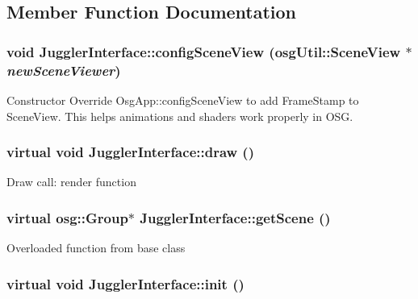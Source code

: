\subsection{Member Function Documentation}
\hypertarget{class_juggler_interface_ad139f98fc6a2d6b5f463ae90d8ce8597}{
\subsubsection[{configSceneView}]{\setlength{\rightskip}{0pt plus 5cm}void JugglerInterface::configSceneView (osgUtil::SceneView $\ast$ {\em newSceneViewer})}}
\label{class_juggler_interface_ad139f98fc6a2d6b5f463ae90d8ce8597}
Constructor Override OsgApp::configSceneView to add FrameStamp to SceneView. This helps animations and shaders work properly in OSG. \hypertarget{class_juggler_interface_aa721246fac943544cb376a21c1d69edb}{
\subsubsection[{draw}]{\setlength{\rightskip}{0pt plus 5cm}virtual void JugglerInterface::draw ()}}
\label{class_juggler_interface_aa721246fac943544cb376a21c1d69edb}
Draw call: render function \hypertarget{class_juggler_interface_ab17e6aa7dc1a248b1a74687a815cb8c3}{
\subsubsection[{getScene}]{\setlength{\rightskip}{0pt plus 5cm}virtual osg::Group$\ast$ JugglerInterface::getScene ()}}
\label{class_juggler_interface_ab17e6aa7dc1a248b1a74687a815cb8c3}
Overloaded function from base class \hypertarget{class_juggler_interface_a3859e165d20b4a94fc5455b38916510a}{
\subsubsection[{init}]{\setlength{\rightskip}{0pt plus 5cm}virtual void JugglerInterface::init ()}}
